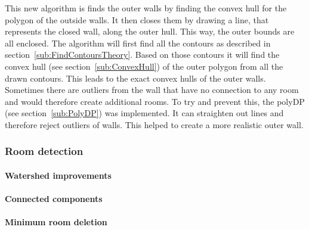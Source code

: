This new algorithm is finds the outer walls by finding the convex hull for the polygon of the outside walls. It then closes them by drawing a line, that represents the closed wall, along the outer hull. This way, the outer bounds are all enclosed.
The algorithm will first find all the contours as described in section~\ref{sub:FindContoursTheory}. Based on those contours it will find the convex hull (see section~\ref{sub:ConvexHull}) of the outer polygon from all the drawn contours. This leads to the exact convex hulls of the outer walls. Sometimes there are outliers from the wall that have no connection to any room and would therefore create additional rooms. To try and prevent this, the polyDP (see section~\ref{sub:PolyDP}) was implemented. It can straighten out lines and therefore reject outliers of walls. This helped to create a more realistic outer wall.
\subsubsection{Room detection}
\paragraph{Watershed improvements}
\paragraph{Connected components}
\paragraph{Minimum room deletion}


